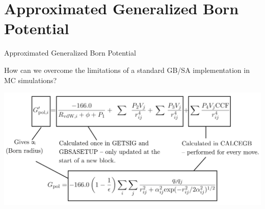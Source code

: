 \documentclass[10pt]{beamer}
\begin{document}

\section{Approximated Generalized Born Potential}


\begin{frame}{Approximated Generalized Born Potential}

How can we overcome the limitations of a standard GB/SA implementation in MC simulations?

\bigskip
\begin{center}
\includegraphics[scale=0.375]{figures/parts.png}
\end{center}

\end{frame}

\end{document}
